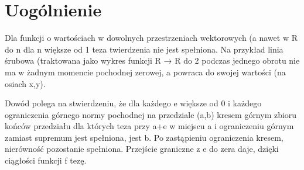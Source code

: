\documentclass{article}
\begin{document}
\section*{Uogólnienie}
Dla funkcji o wartościach w dowolnych przestrzeniach wektorowych (a nawet w R do n dla n większe od 1 teza twierdzenia nie jest spełniona. Na przykład linia śrubowa (traktowana jako wykres funkcji R → R do 2 podczas jednego obrotu nie ma w żadnym momencie pochodnej zerowej, a powraca do swojej wartości (na osiach x,y). 

Dowód polega na stwierdzeniu, że dla każdego e większe od 0 i każdego ograniczenia górnego normy pochodnej na przedziale (a,b) kresem górnym zbioru końców przedziału dla których teza przy a+e w miejscu a i ograniczeniu górnym zamiast supremum jest spełniona, jest b. Po zastąpieniu ograniczenia kresem, nierówność pozostanie spełniona. Przejście graniczne z e do zera daje, dzięki ciągłości funkcji f tezę. 
\end{document}
